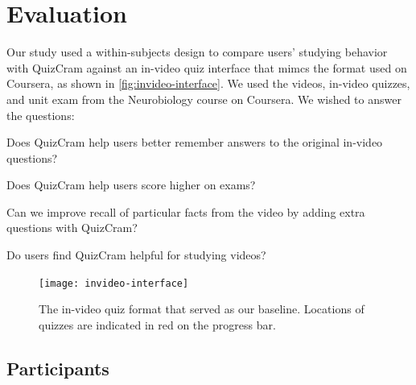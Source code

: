 \documentclass{sigchi}
\begin{document}
\section{Evaluation}
Our study used a within-subjects design to compare users' studying behavior with QuizCram against an in-video quiz interface that mimcs the format used on Coursera, as shown in \autoref{fig:invideo-interface}. We used the videos, in-video quizzes, and unit exam from the Neurobiology course on Coursera. We wished to answer the questions:

\begin{compactitem}
\item Does QuizCram help users better remember answers to the original in-video questions?
\item Does QuizCram help users score higher on exams?
\item Can we improve recall of particular facts from the video by adding extra questions with QuizCram?
\item Do users find QuizCram helpful for studying videos?
\end{compactitem}

\begin{figure}
\centering
\texttt{[image: invideo-interface]}
\caption{The in-video quiz format that served as our baseline. Locations of quizzes are indicated in red on the progress bar.}
\label{fig:invideo-interface}
\end{figure}



\subsection{Participants}
\end{document}
